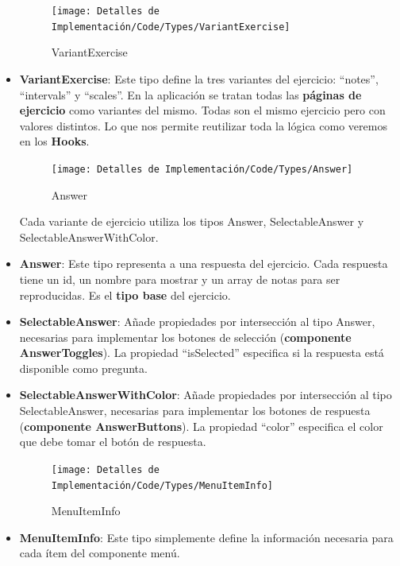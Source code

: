 \documentclass[12pt,twoside,titlepage]{report}
\begin{document}
\begin{itemize}
    \begin{figure}[H]
        \centering
        \texttt{[image: Detalles de Implementación/Code/Types/VariantExercise]}
        \label{fig:VariantExercise}
        \caption{VariantExercise}
    \end{figure}

    \item \textbf{VariantExercise}: Este tipo define la tres variantes del ejercicio: ``notes'', ``intervals'' y ``scales''. En la aplicación se tratan todas las \textbf{páginas de ejercicio} como variantes del mismo. Todas son el mismo ejercicio pero con valores distintos. Lo que nos permite reutilizar toda la lógica como veremos en los \textbf{Hooks}.

    \begin{figure}[H]
        \centering
        \texttt{[image: Detalles de Implementación/Code/Types/Answer]}
        \label{fig:Answer}
        \caption{Answer}
    \end{figure}

    Cada variante de ejercicio utiliza los tipos Answer, SelectableAnswer y SelectableAnswerWithColor. 

    \item \textbf{Answer}: Este tipo representa a una respuesta del ejercicio. Cada respuesta tiene un id, un nombre para mostrar y un array de notas para ser reproducidas. Es el \textbf{tipo base} del ejercicio.
    \item \textbf{SelectableAnswer}: Añade propiedades por intersección al tipo Answer, necesarias para implementar los botones de selección (\textbf{componente AnswerToggles}). La propiedad ``isSelected'' especifica si la respuesta está disponible como pregunta.
    \item \textbf{SelectableAnswerWithColor}: Añade propiedades por intersección al tipo SelectableAnswer, necesarias para implementar los botones de respuesta (\textbf{componente AnswerButtons}). La propiedad ``color'' especifica el color que debe tomar el botón de respuesta.

    \begin{figure}[H]
        \centering
        \texttt{[image: Detalles de Implementación/Code/Types/MenuItemInfo]}
        \label{fig:MenuItemInfo}
        \caption{MenuItemInfo}
    \end{figure}

    \item \textbf{MenuItemInfo}: Este tipo simplemente define la información necesaria para cada ítem del componente menú.
\end{itemize}
\end{document}
